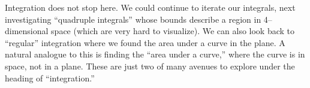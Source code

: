 Integration does not stop here. We could continue to iterate our integrals, next investigating ``quadruple integrals'' whose bounds describe a region in 4--dimensional space (which are very hard to visualize).   We can also look back to ``regular'' integration where we found the area under a curve in the plane. A natural analogue to this is finding the ``area under a curve,'' where the curve is in space, not in a plane.  These are just two of many avenues to explore under the heading of ``integration.'' 

